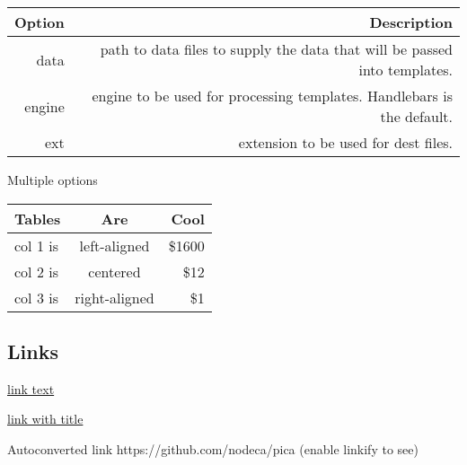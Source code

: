 \documentclass[]{article}
\begin{document}
\begin{longtable}[]{@{}rr@{}}
\toprule
\begin{minipage}[b]{0.10\columnwidth}\raggedleft\strut
Option\strut
\end{minipage} & \begin{minipage}[b]{0.17\columnwidth}\raggedleft\strut
Description\strut
\end{minipage}\tabularnewline
\midrule
\endhead
\begin{minipage}[t]{0.10\columnwidth}\raggedleft\strut
data\strut
\end{minipage} & \begin{minipage}[t]{0.17\columnwidth}\raggedleft\strut
path to data files to supply the data that will be passed into
templates.\strut
\end{minipage}\tabularnewline
\begin{minipage}[t]{0.10\columnwidth}\raggedleft\strut
engine\strut
\end{minipage} & \begin{minipage}[t]{0.17\columnwidth}\raggedleft\strut
engine to be used for processing templates. Handlebars is the
default.\strut
\end{minipage}\tabularnewline
\begin{minipage}[t]{0.10\columnwidth}\raggedleft\strut
ext\strut
\end{minipage} & \begin{minipage}[t]{0.17\columnwidth}\raggedleft\strut
extension to be used for dest files.\strut
\end{minipage}\tabularnewline
\bottomrule
\end{longtable}

Multiple options

\begin{longtable}[]{@{}lcr@{}}
\toprule
Tables & Are & Cool\tabularnewline
\midrule
\endhead
col 1 is & left-aligned & \$1600\tabularnewline
col 2 is & centered & \$12\tabularnewline
col 3 is & right-aligned & \$1\tabularnewline
\bottomrule
\end{longtable}

\subsection{Links}\label{links}

\href{http://dev.nodeca.com}{link text}

\href{http://nodeca.github.io/pica/demo/}{link with title}

Autoconverted link https://github.com/nodeca/pica (enable linkify to
see)
\end{document}
